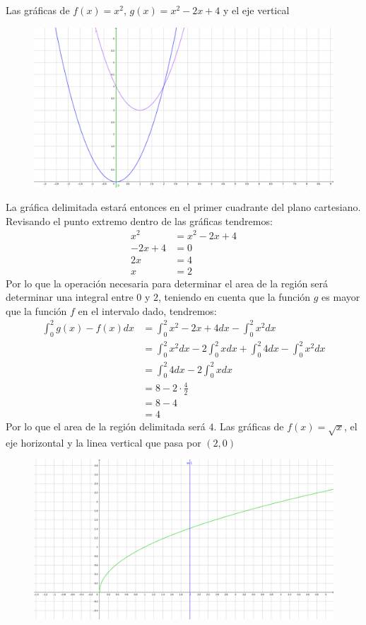 \documentclass[../../main.tex]{subfiles}
\begin{document}
\begin{partes}
    \parte Las gráficas de $f(x) = x^2$, $g(x) = x^2-2x+4$ y el eje vertical\\
    \begin{figure}[h]
        \centering
        \includegraphics[width=12cm]{Parte 1/grafica5.png}
    \end{figure}
    La gráfica delimitada estará entonces en el primer cuadrante del plano cartesiano. Revisando el punto extremo dentro de las gráficas tendremos:
    \begin{align*}
        x^2 &= x^2-2x+4\\
        -2x+4 &= 0\\
        2x &= 4\\
        x &= 2
    \end{align*}
    Por lo que la operación necesaria para determinar el area de la región será determinar una integral entre $0$ y $2$, teniendo en cuenta que
    la función $g$ es mayor que la función $f$ en el intervalo dado, tendremos:
    \begin{align*}
        \int_{0}^2 g(x)-f(x)dx &= \int_{0}^2 x^2-2x+4 dx - \int_{0}^2 x^2 dx\\
        &= \int_{0}^2 x^2 dx - 2\int_{0}^2 x dx + \int_{0}^2 4 dx - \int_{0}^2 x^2 dx\\
        &= \int_{0}^2 4 dx - 2\int_{0}^2 x dx\\
        &= 8 - 2 \cdot \frac{4}{2}\\
        &= 8 - 4\\
        &= 4
    \end{align*}
    Por lo que el area de la región delimitada será $4$.
    \parte Las gráficas de $f(x) = \sqrt{x}$, el eje horizontal y la linea vertical que pasa por $(2, 0)$ \\
    \begin{figure}[h]
        \centering
        \includegraphics[width=12cm]{Parte 1/grafica6.png}

\end{figure}
\end{partes}
\end{document}
